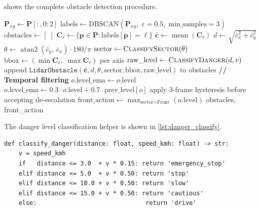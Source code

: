 \documentclass[12pt,a4paper]{article}
\begin{document}
 shows the complete obstacle detection procedure.

\begin{algorithm}[H]
\caption{DBSCAN-Based LiDAR Obstacle Detection}
\label{alg:dbscan_detect}
\begin{algorithmic}[1]
\State $\mathbf{P}_{xy} \leftarrow \mathbf{P}[:,0{:}2]$
\State $\text{labels} \leftarrow
       \text{DBSCAN}(\mathbf{P}_{xy},\;\varepsilon=0.5,\;\text{min\_samples}=3)$
\State $\text{obstacles} \leftarrow [\;]$
  \State $\mathbf{C}_\ell \leftarrow \{\mathbf{p}\in\mathbf{P} :
         \text{labels}[\mathbf{p}]=\ell\}$
  \State $\bar{\mathbf{c}} \leftarrow \operatorname{mean}(\mathbf{C}_\ell)$
  \State $d \leftarrow \sqrt{\bar{c}_x^2 + \bar{c}_y^2}$
  \State $\theta \leftarrow \operatorname{atan2}(\bar{c}_y,\, \bar{c}_x)
         \cdot 180/\pi$
  \State $\text{sector} \leftarrow \textsc{ClassifySector}(\theta)$
  \State $\text{bbox} \leftarrow
         (\min\mathbf{C}_\ell,\;\max\mathbf{C}_\ell)$ per axis
  \State $\text{raw\_level} \leftarrow
         \textsc{ClassifyDanger}(d, v)$
  \hspace{1em}
  \State append $\texttt{LidarObstacle}(\bar{\mathbf{c}}, d, \theta,
         \text{sector}, \text{bbox}, \text{raw\_level})$ to obstacles
\EndFor
\State \textbf{// Temporal filtering}
    \hspace{2em}
    \State $o.\text{level\_ema} \leftarrow o.\text{level}$
  \Else
    \State $o.\text{level\_ema} \leftarrow
           0.3\cdot o.\text{level} + 0.7\cdot\text{prev\_level}[o]$
  \EndIf
  \State apply 3-frame hysteresis before accepting de-escalation
\EndFor
\State $\text{front\_action} \leftarrow
       \max_{\text{sector}=\text{Front}}(o.\text{level})$
\State \Return obstacles, front\_action
\end{algorithmic}
\end{algorithm}

The danger level classification helper is shown in \cref{lst:danger_classify}.

\begin{lstlisting}[caption={Speed-adaptive danger level classification
                   (\texttt{classify\_danger}).},
                   label={lst:danger_classify}]
def classify_danger(distance: float, speed_kmh: float) -> str:
    v = speed_kmh
    if   distance <= 3.0  + v * 0.15: return 'emergency_stop'
    elif distance <= 5.0  + v * 0.50: return 'stop'
    elif distance <= 10.0 + v * 0.50: return 'slow'
    elif distance <= 15.0 + v * 0.50: return 'cautious'
    else:                              return 'drive'
\end{lstlisting}
\end{document}
